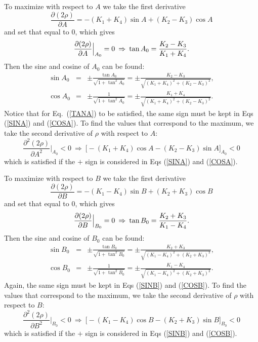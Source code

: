 To maximize with respect to $A$ we take the first derivative
\begin{equation}
\frac{\partial(2 \rho)}{\partial A} = - (K_1+K_4) \sin A
+(K_2-K_3) \cos A
\end{equation}
and set that equal to 0, which gives
\begin{equation}
\frac{\partial(2 \rho)}{\partial A} \Big |_{A_0} = 0 \: \Rightarrow
\: \tan A_0 =\frac{K_2-K_3}{K_1+K_4}. \\
\label{TANA}
\end{equation}
Then the sine and cosine of $A_0$ can be found:
\begin{eqnarray}
\sin A_0 &=& \pm \frac{\tan A_0}{\sqrt{1 + \tan^2 A_0}} = \pm
\frac{K_2-K_3}{\sqrt{(K_1+K_4)^2 +(K_2-K_3)^2}},  \label{SINA} \\
\cos A_0 &=& \pm \frac{1}{\sqrt{1 + \tan^2 A_0}} = \pm
\frac{K_1+K_4}{\sqrt{(K_1+K_4)^2 +(K_2-K_3)^2}}.
\label{COSA}
\end{eqnarray}
Notice that for Eq.~(\ref{TANA}) to be satisfied, the same sign must be kept
in Eqs (\ref{SINA}) and (\ref{COSA}).
To find the values that correspond to the maximum, we take the second
derivative of $\rho$ with respect to $A$:
\begin{equation}
\frac{\partial^2(2 \rho)}{\partial A^2}\Big |_{A_0} < 0 \: \Rightarrow
\: \Big [ - (K_1+K_4) \cos A - (K_2-K_3) \sin A \Big ]_{A_0} < 0
\end{equation}
which is satisfied if the $+$ sign is considered in Eqs (\ref{SINA}) and
(\ref{COSA}).

To maximize with respect to $B$ we take the first derivative
\begin{equation}
\frac{\partial(2 \rho)}{\partial B}  = - (K_1-K_4) \sin B
+(K_2+K_3) \cos B
\end{equation}
and set that equal to 0, which gives
\begin{equation}
\frac{\partial(2 \rho)}{\partial B} \Big |_{B_0} = 0 \: \Rightarrow
\: \tan B_0 =\frac{K_2+K_3}{K_1-K_4}. \\
\label{TANB}
\end{equation}
Then the sine and cosine of $B_0$ can be found:
\begin{eqnarray}
\sin B_0 &=& \pm \frac{\tan B_0}{\sqrt{1 + \tan^2 B_0}} = \pm
\frac{K_2+K_3}{\sqrt{(K_1-K_4)^2 +(K_2+K_3)^2}},  \label{SINB} \\
\cos B_0 &=& \pm \frac{1}{\sqrt{1 + \tan^2 B_0}} = \pm
\frac{K_1-K_4}{\sqrt{(K_1-K_4)^2 +(K_2+K_3)^2}}.
\label{COSB}
\end{eqnarray}
Again, the same sign must be kept in Eqs (\ref{SINB}) and (\ref{COSB}).
To find the values that correspond to the maximum, we take the second
derivative of $\rho$ with respect to $B$:
\begin{equation}
\frac{\partial^2(2 \rho)}{\partial B^2}\Big |_{B_0} < 0 \: \Rightarrow
\: \Big [ - (K_1-K_4) \cos B - (K_2+K_3) \sin B \Big ]_{B_0} < 0
\end{equation}
which is satisfied if the $+$ sign is considered in Eqs (\ref{SINB}) and
(\ref{COSB}).

